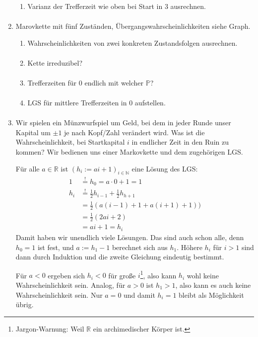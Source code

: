 \documentclass[a4paper,11pt,notitlepage,fullpage]{article}
\newcommand{\R}{\mathbb R}
\newcommand{\N}{\mathbb N}
\newcommand{\p}{\mathbb P}
\begin{document}
\begin{enumerate}
\begin{enumerate}
\item Varianz der Trefferzeit wie oben bei Start in $3$ ausrechnen.
\begin{align*}
\end{align*}
\end{enumerate}

\item Marovkette mit fünf Zuständen, Übergangswahrscheinlichkeiten siehe Graph.
\begin{enumerate}
\item Wahrscheinlichkeiten von zwei konkreten Zustandsfolgen ausrechnen.
\begin{align*}
\end{align*}

\item Kette irreduzibel?
\begin{align*}
\end{align*}

\item Trefferzeiten für $0$ endlich mit welcher $\p$?
\begin{align*}
\end{align*}

\item LGS für mittlere Trefferzeiten in $0$ aufstellen.
\begin{align*}
\end{align*}
\end{enumerate}

\item Wir spielen ein Münzwurfspiel um Geld, bei dem in jeder Runde unser Kapital um $\pm 1$ je nach Kopf/Zahl verändert wird. Was ist die Wahrscheinlichkeit, bei Startkapital $i$ in endlicher Zeit in den Ruin zu kommen? Wir bedienen uns einer Markovkette und dem zugehörigen LGS.

Für alle $a \in \R$ ist $(h_i := ai + 1)_{i \in \N}$ eine Lösung des LGS:
\begin{align*}
1 &\stackrel{!}{=} h_0 = a\cdot 0 + 1 = 1 \\
h_i &\stackrel{!}{=} \frac{1}{2}h_{i-1} + \frac{1}{2}h_{h+1} \\
&= \frac{1}{2}(a(i-1) + 1 + a(i+1) + 1)) \\
&= \frac{1}{2}(2ai + 2) \\
&= ai+1 = h_i
\end{align*}
Damit haben wir unendlich viele Lösungen. Das sind auch schon alle, denn $h_0 = 1$ ist fest, und $a := h_1 - 1$ berechnet sich aus $h_1$. Höhere $h_i$ für $i>1$ sind dann durch Induktion und die zweite Gleichung eindeutig bestimmt.

Für $a < 0$ ergeben sich $h_i < 0$ für große $i$\footnote{Jargon-Warnung: Weil $\R$ ein archimedischer Körper ist.}, also kann $h_i$ wohl keine Wahrscheinlichkeit sein. Analog, für $a > 0$ ist $h_1 > 1$, also kann es auch keine Wahrscheinlichkeit sein. Nur $a = 0$ und damit $h_i = 1$ bleibt als Möglichkeit übrig.

\end{enumerate}
\end{document}
